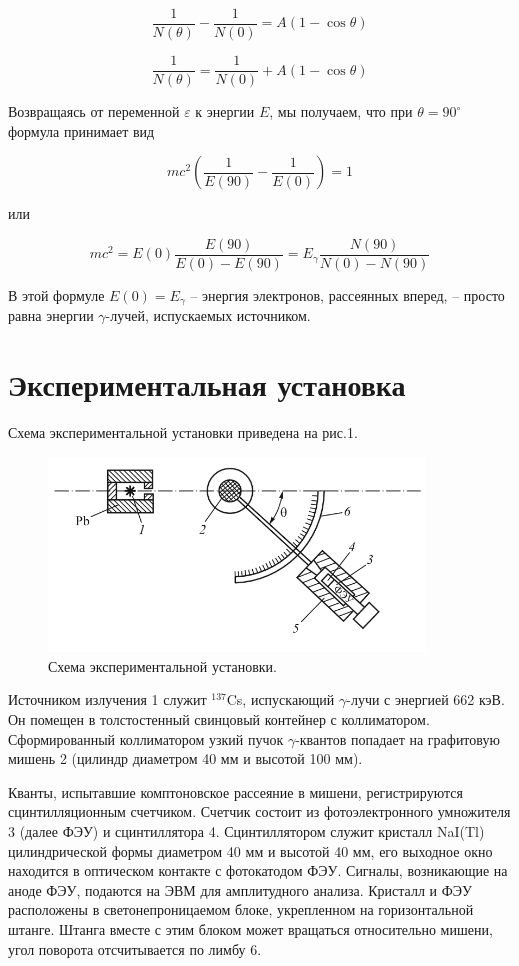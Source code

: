 \documentclass[a4paper,12pt]{article}
\begin{document}
	\[	\frac{1}{N(\theta)} - \frac{1}{N(0)} = A(1 - \cos\theta)\]
	
		\[	\frac{1}{N(\theta)} = \frac{1}{N(0)} + A(1 - \cos\theta)\]
	
	
	Возвращаясь от переменной $\varepsilon$ к энергии $E$, мы получаем, что при $\theta = 90^\circ$ формула принимает вид

\[mc^2 \left(\frac{1}{E(90)} - \frac{1}{E(0)}\right) = 1\]

 или

\[		mc^2 = E(0)\frac{E(90)}{E(0) - E(90)} = E_\gamma \frac{N(90)}{N(0) - N(90)}\]
	
	В этой формуле $E(0) = E_\gamma$ -- энергия электронов, рассеянных вперед, -- просто равна энергии $\gamma$-лучей, испускаемых источником.
	
	
	
\section{Экспериментальная установка} 
   
   
Схема экспериментальной установки приведена на рис.1.
  
    \begin{figure}[H]
  \begin{center}
    \includegraphics[width=10cm]{ex1.png}
    \caption{Схема экспериментальной установки.}
    \label{fig:}
  \end{center}
\end{figure}
 
Источником излучения 1 служит $^{137}$Cs, испускающий $\gamma$-лучи с энергией 662 кэВ. Он помещен в толстостенный свинцовый контейнер с коллиматором. Сформированный коллиматором узкий пучок $\gamma$-квантов попадает на графитовую мишень 2 (цилиндр диаметром 40 мм и высотой 100 мм).
 
 	Кванты, испытавшие комптоновское рассеяние в мишени, регистрируются сцинтилляционным счетчиком. Счетчик состоит из фотоэлектронного умножителя 3 (далее ФЭУ) и сцинтиллятора 4. Сцинтиллятором служит
 	кристалл NaI(Tl) цилиндрической формы диаметром 40 мм и высотой 40 мм, его выходное окно находится в оптическом контакте с фотокатодом ФЭУ. Сигналы, возникающие на аноде ФЭУ, подаются на ЭВМ для амплитудного анализа. Кристалл и ФЭУ расположены в светонепроницаемом блоке, укрепленном на горизонтальной штанге. Штанга вместе с этим блоком может вращаться относительно мишени, угол поворота отсчитывается по лимбу 6.
 	
\end{document}
